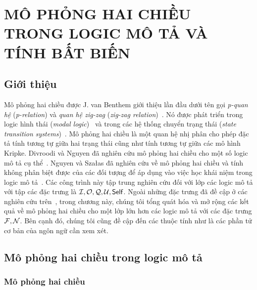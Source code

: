 \chapter[Mô phỏng hai chiều trong logic mô tả và tính bất biến đối~với mô phỏng hai chiều]{MÔ PHỎNG HAI CHIỀU TRONG LOGIC MÔ TẢ VÀ TÍNH BẤT BIẾN}
\label{Chapter2}
\thispagestyle{fancy}

\section{Giới thiệu}
\label{sec:Chap2.Introduction}
Mô phỏng hai chiều được J. van Benthem giới thiệu lần đầu dưới tên gọi {\em p-quan hệ} ({\em p-relation}) và {\em quan hệ zig-zag} ({\em zig-zag relation})~\cite{Benthem1983,Benthem1984}. Nó được phát triển trong logic hình thái ({\em modal logic})~\cite{Benthem2001,Blackburn2001,Blackburn2006,Benthem2010} và trong các hệ thống chuyển trạng thái ({\em state transition systems})~\cite{Park1981,Hennessy1985}. 
Mô phỏng hai chiều là một quan hệ nhị phân cho phép đặc tả tính tương tự giữa hai trạng thái cũng như tính tương tự giữa các mô hình Kripke. Divroodi và Nguyen đã nghiên cứu mô phỏng hai chiều cho một số logic mô tả cụ thể~\cite{Divroodi2011B}. Nguyen và Sza{\l}as đã nghiên cứu về mô phỏng hai chiều và tính không phân biệt được của các đối tượng để áp dụng vào việc học khái niệm trong logic mô tả~\cite{Nguyen2013}. 
Các công trình này tập trung nghiên cứu đối với lớp các logic mô tả \ALCreg với tập các đặc trưng là $\mathcal{I}, \mathcal{O}, \mathcal{Q}, \mathcal{U}, \mathsf{Self}$. Ngoài những đặc trưng đã đề cập ở các nghiên cứu trên~\cite{Divroodi2011B,Nguyen2013}, trong chương này, chúng tôi tổng quát hóa và mở rộng các kết quả về mô phỏng hai chiều cho một lớp lớn hơn các logic mô tả với các đặc trưng $\mathcal{F}, \mathcal{N}$. Bên cạnh đó, chúng tôi cũng đề cập đến các thuộc tính như là các phần tử cơ bản của ngôn ngữ cần xem xét.

\section{Mô phỏng hai chiều trong logic mô tả}
\label{sec:Chap2.BisimulationInDL}
\subsection{Mô phỏng hai chiều}
\label{sec:Chap2.Bisimulation}


